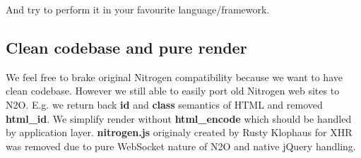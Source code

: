 \documentclass[11pt]{article}
\begin{document}

And try to perform it in your favourite language/framework.

\subsection*{Clean codebase and pure render}
We feel free to brake original Nitrogen compatibility because we want to have clean codebase.
However we still able to easily port old Nitrogen web sites to N2O. 
E.g. we return back {\bf id} and {\bf class} semantics of HTML and removed {\bf html\_id}.
We simplify render without {\bf html\_encode} which should be handled by application layer.
{\bf nitrogen.js} originaly created by Rusty Klophaus for XHR was removed due to pure
WebSocket nature of N2O and native jQuery handling.








\end{document}

